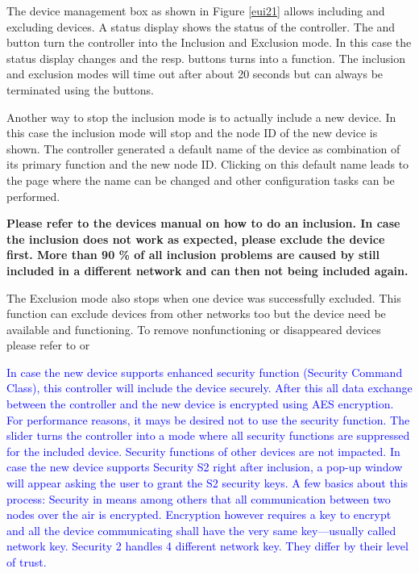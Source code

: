 The device management box as shown in Figure \ref{eui21} allows including and excluding 
\zwave devices. A status display shows the status of the controller. The  
and  button turn the controller into the Inclusion and Exclusion mode. In 
this case the status display changes and the resp. buttons turns into a  function. 
The inclusion and exclusion modes will time out after about 20 seconds but can always be 
terminated using the  buttons.

Another way to stop the inclusion mode is to actually include a new device. In this case
 the inclusion mode will stop and the node ID of the new device is shown. The controller 
 generated a default name of the device as combination of its primary function and the 
 new node ID. Clicking on this default name leads to the  page where the 
 name can be changed and other configuration tasks can be performed.

\textbf{Please refer to the devices manual on how to do an inclusion. In case the 
inclusion does not work as expected, please exclude the device first. More than 90 \% of 
all inclusion problems are caused by still included in a different network and can then 
not being included again.}

The Exclusion mode also stops when one device was successfully excluded. This function 
can exclude devices from other networks too but the device need be available and 
functioning. To remove nonfunctioning or disappeared devices please refer to 
 or 

\textcolor{blue}{
In case the new device supports enhanced security function (Security Command Class), this 
controller will include the device securely. After this all data exchange between the 
controller and the new device is encrypted using AES encryption. For performance reasons, 
it mays be desired not to use the security function. The slider  
turns the controller into a mode where all security functions are suppressed for the included 
device. Security functions of other devices are not impacted. In case the new device supports 
Security S2 right after inclusion, a pop-up window will appear asking the user to grant the 
S2 security keys.
A few basics about this process: Security in \zwave means among others that all 
communication between two nodes over the air is encrypted. Encryption however requires 
a key to encrypt and all the device communicating shall have the very same key---usually 
called network key. \zwave Security 2 handles 4 different network key. They differ by 
their level of trust.}

